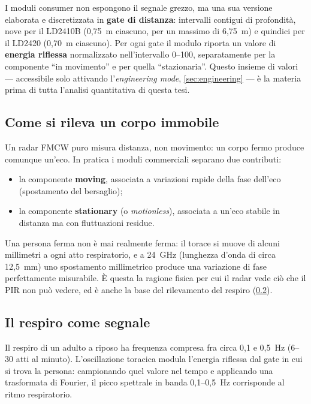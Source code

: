I moduli consumer non espongono il segnale grezzo, ma una sua versione elaborata e
discretizzata in \textbf{gate di distanza}: intervalli contigui di profondità, nove
per il LD2410B (0,75~m ciascuno, per un massimo di 6,75~m) e quindici per il
LD2420 (0,70~m ciascuno). Per ogni gate il modulo riporta un valore di
\textbf{energia riflessa} normalizzato nell'intervallo 0--100, separatamente per la
componente ``in movimento'' e per quella ``stazionaria''. Questo insieme di valori
--- accessibile solo attivando l'\emph{engineering mode}, \cref{sec:engineering} ---
è la materia prima di tutta l'analisi quantitativa di questa tesi.

\subsection{Come si rileva un corpo immobile}

Un radar FMCW puro misura distanza, non movimento: un corpo fermo produce comunque
un'eco. In pratica i moduli commerciali separano due contributi:

\begin{itemize}[leftmargin=1.4em,itemsep=2pt]
  \item la componente \textbf{moving}, associata a variazioni rapide della fase
        dell'eco (spostamento del bersaglio);
  \item la componente \textbf{stationary} (o \emph{motionless}), associata a
        un'eco stabile in distanza ma con fluttuazioni residue.
\end{itemize}

Una persona ferma non è mai realmente ferma: il torace si muove di alcuni
millimetri a ogni atto respiratorio, e a 24~GHz (lunghezza d'onda di circa
12,5~mm) uno spostamento millimetrico produce una variazione di fase perfettamente
misurabile. È questa la ragione fisica per cui il radar vede ciò che il PIR non può
vedere, ed è anche la base del rilevamento del respiro
(\cref{sec:respiro-teoria}).

\subsection{Il respiro come segnale}
\label{sec:respiro-teoria}

Il respiro di un adulto a riposo ha frequenza compresa fra circa 0,1 e 0,5~Hz
(6--30 atti al minuto). L'oscillazione toracica modula l'energia riflessa dal gate
in cui si trova la persona: campionando quel valore nel tempo e applicando una
trasformata di Fourier, il picco spettrale in banda 0,1--0,5~Hz corrisponde al
ritmo respiratorio.


